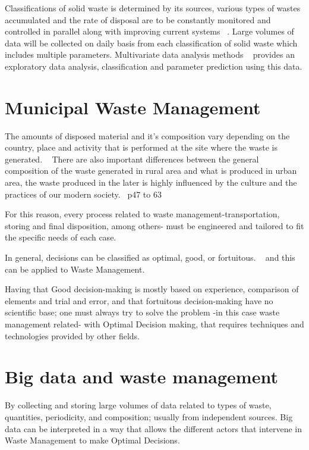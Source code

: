 \documentclass[sigconf]{acmart}
\begin{document}
Classifications of solid waste is determined by its sources, various types of wastes accumulated and the rate of disposal are to be constantly monitored and controlled in parallel along with improving current systems ~\cite{chandrappa2012}. Large volumes of data will be collected on daily basis from each classification of solid waste which includes multiple parameters. Multivariate data analysis methods ~\cite{bohm2013} provides an exploratory data analysis, classification and parameter prediction using this data.

\section{ Municipal Waste Management}

The amounts of disposed material and it's composition vary depending on the country, place and activity that is performed at the site where the waste is generated. ~\cite{chandrappa2012} 
There are also important differences between the general composition of the waste generated in rural area and what is produced in urban area, the waste produced in the later is highly influenced by the culture and the practices of our modern society.~\cite{chandrappa2012} p47 to 63

For this reason, every process related to waste management-transportation, storing and final disposition, among others- must be engineered and tailored to fit the specific needs of each case.



In general, decisions can be classified as optimal, good, or fortuitous. ~\cite{akbarpour2016} and this can be applied to Waste Management.

Having that Good decision-making is mostly based on experience, comparison of elements and trial and error, and that fortuitous decision-making have no scientific base; one must always try to solve the problem -in this case waste management related- with Optimal Decision making, that requires techniques and technologies provided by other fields. 
 ~\cite{akbarpour2016}


\section{ Big data and waste management}
By collecting and storing large volumes of  data related to types of waste, quantities, periodicity, and composition; usually from independent sources. Big data can be interpreted in a way that allows the different actors that intervene in Waste Management to make Optimal Decisions.~\cite{yenkar2014review}
\end{document}
